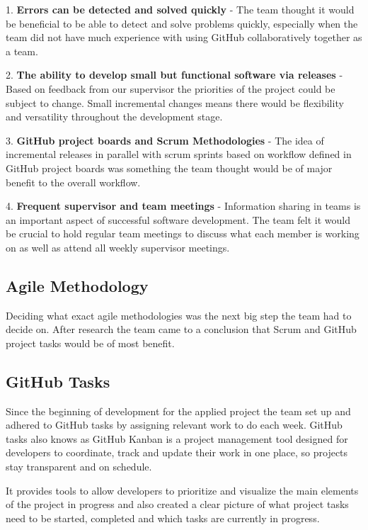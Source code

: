\vspace{70mm} %

1. \textbf{Errors can be detected and solved quickly} - The team thought it would be beneficial to be able to detect and solve problems quickly, especially when the team did not have much experience with using GitHub collaboratively together as a team.

2. \textbf{The ability to develop small but functional software via releases} - Based on feedback from our supervisor the priorities of the project could be subject to change. Small incremental changes means there would be flexibility and versatility throughout the development stage.

3. \textbf{GitHub project boards and Scrum Methodologies} - The idea of incremental releases in parallel with scrum sprints based on workflow defined in GitHub project boards was something the team thought would be of major benefit to the overall workflow.

4. \textbf{Frequent supervisor and team meetings} - Information sharing in teams is an important aspect of successful software development. The team felt it would be crucial to hold regular team meetings to discuss what each member is working on as well as attend all weekly supervisor meetings.

\subsection{Agile Methodology}
Deciding what exact agile methodologies was the next big step the team had to decide on. After research the team came to a conclusion that Scrum and GitHub project tasks would be of most benefit.


\subsection{GitHub Tasks}
Since the beginning of development for the applied project the team set up and adhered to GitHub tasks by assigning relevant work to do each week. GitHub tasks also knows as GitHub Kanban is a project management tool designed for developers to coordinate, track and update their work in one place, so projects stay transparent and on schedule.

\vspace{5mm} %


It provides tools to allow developers to prioritize and visualize the main elements of the project in progress and also created a clear picture of what project tasks need to be started, completed and which tasks are currently in progress.\cite{GitHubtasks}



